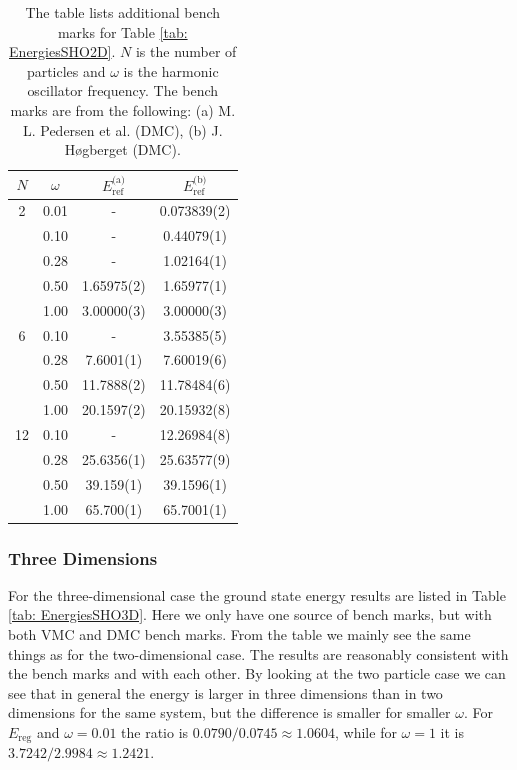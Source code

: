 \documentclass[../main.tex]{subfiles}
\begin{document}
\begin{table}[!ht]
  \centering
  \begin{tabular}{c c c c}
    \hline
    \hline
    $N$ & $\omega$ & $E_\textrm{ref}^\textrm{(a)}$ & $E_\textrm{ref}^\textrm{(b)}$ \\*
    \hline
    2 & 0.01 & - & 0.073839(2) \\*
      & 0.10 & - & 0.44079(1) \\*
      & 0.28 & - & 1.02164(1) \\*
      & 0.50 & 1.65975(2) & 1.65977(1) \\*
      & 1.00 & 3.00000(3) & 3.00000(3) \vspace{2 mm}\\*
      
    6 & 0.10 & - & 3.55385(5) \\*
      & 0.28 & 7.6001(1) & 7.60019(6) \\*
      & 0.50 & 11.7888(2) & 11.78484(6) \\*
      & 1.00 & 20.1597(2) & 20.15932(8) \vspace{2 mm}\\*
      
    12 & 0.10 & - & 12.26984(8) \\*
       & 0.28 & 25.6356(1) & 25.63577(9) \\*
       & 0.50 & 39.159(1) & 39.1596(1) \\*
       & 1.00 & 65.700(1) & 65.7001(1) \\*
    \hline
    \hline
  \end{tabular}
  \caption{The table lists additional bench marks for Table \ref{tab: EnergiesSHO2D}. $N$ is the number of particles and $\omega$ is the harmonic oscillator frequency. The bench marks are from the following: (a) M. L. Pedersen et al. \cite{QDotBenchmarks} (DMC), (b) J. Høgberget \cite{Jorgen} (DMC).}
  \label{tab: DMCEnergiesSHO2D}
\end{table}

\subsubsection{Three Dimensions}

For the three-dimensional case the ground state energy results are listed in Table \ref{tab: EnergiesSHO3D}. Here we only have one source of bench marks, but with both VMC and DMC bench marks. From the table we mainly see the same things as for the two-dimensional case. The results are reasonably consistent with the bench marks and with each other. By looking at the two particle case we can see that in general the energy is larger in three dimensions than in two dimensions for the same system, but the difference is smaller for smaller $\omega$. For $E_\textrm{reg}$ and $\omega = 0.01$ the ratio is $0.0790/0.0745 \approx 1.0604$, while for $\omega = 1$ it is $3.7242/2.9984 \approx 1.2421$.
\end{document}
